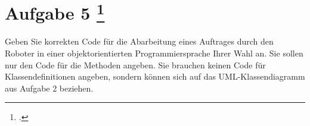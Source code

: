 \documentclass{lehramt-informatik-aufgabe}
\begin{document}
\section{Aufgabe 5
\footcite{66116:2019:03}}

Geben Sie korrekten Code für die Abarbeitung eines Auftrages durch den
Roboter in einer objektorientierten Programmiersprache Ihrer Wahl an.
Sie sollen nur den Code für die Methoden angeben. Sie brauchen keinen
Code für Klassendefinitionen angeben, sondern können sich auf das
UML-Klassendiagramm aus Aufgabe 2 beziehen.

\end{document}
